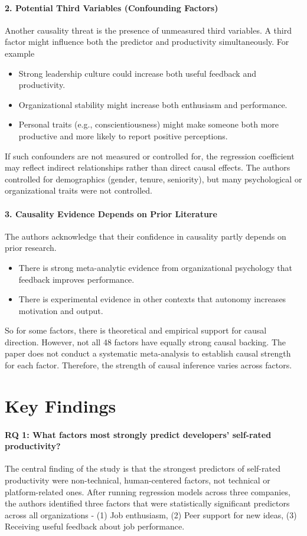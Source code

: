 \paragraph{2. Potential Third Variables (Confounding Factors)}
Another causality threat is the presence of unmeasured third variables. A third factor might influence both the predictor and productivity simultaneously.
For example
\begin{itemize}
    \item Strong leadership culture could increase both useful feedback and productivity.
    \item Organizational stability might increase both enthusiasm and performance.
    \item Personal traits (e.g., conscientiousness) might make someone both more productive and more likely to report positive perceptions.
\end{itemize}
If such confounders are not measured or controlled for, the regression coefficient may reflect indirect relationships rather than direct causal effects. The authors controlled for demographics (gender, tenure, seniority), but many psychological or organizational traits were not controlled.

\paragraph{3. Causality Evidence Depends on Prior Literature}
The authors acknowledge that their confidence in causality partly depends on prior research.
\begin{itemize}
    \item There is strong meta-analytic evidence from organizational psychology that feedback improves performance.
    \item There is experimental evidence in other contexts that autonomy increases motivation and output.
\end{itemize}
So for some factors, there is theoretical and empirical support for causal direction. However, not all 48 factors have equally strong causal backing. The paper does not conduct a systematic meta-analysis to establish causal strength for each factor. Therefore, the strength of causal inference varies across factors.

\section{Key Findings}
\paragraph{RQ 1: What factors most strongly predict developers’ self-rated productivity?}
The central finding of the study is that the strongest predictors of self-rated productivity were non-technical, human-centered factors, not technical or platform-related ones. After running regression models across three companies, the authors identified three factors that were statistically significant predictors across all organizations - (1) Job enthusiasm, (2) Peer support for new ideas, (3) Receiving useful feedback about job performance.

